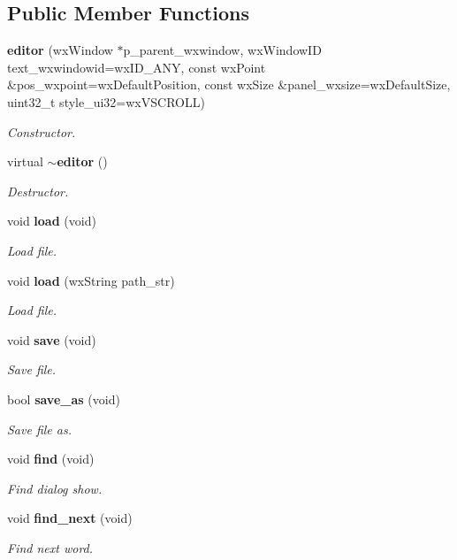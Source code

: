 \subsection*{Public Member Functions}
\begin{DoxyCompactItemize}
\item 
\textbf{ editor} (wx\+Window $\ast$p\+\_\+parent\+\_\+wxwindow, wx\+Window\+ID text\+\_\+wxwindowid=wx\+I\+D\+\_\+\+A\+NY, const wx\+Point \&pos\+\_\+wxpoint=wx\+Default\+Position, const wx\+Size \&panel\+\_\+wxsize=wx\+Default\+Size, uint32\+\_\+t style\+\_\+ui32=wx\+V\+S\+C\+R\+O\+LL)
\begin{DoxyCompactList}\small\item\em Constructor. \end{DoxyCompactList}\item 
virtual \textbf{ $\sim$editor} ()
\begin{DoxyCompactList}\small\item\em Destructor. \end{DoxyCompactList}\item 
void \textbf{ load} (void)
\begin{DoxyCompactList}\small\item\em Load file. \end{DoxyCompactList}\item 
void \textbf{ load} (wx\+String path\+\_\+str)
\begin{DoxyCompactList}\small\item\em Load file. \end{DoxyCompactList}\item 
void \textbf{ save} (void)
\begin{DoxyCompactList}\small\item\em Save file. \end{DoxyCompactList}\item 
bool \textbf{ save\+\_\+as} (void)
\begin{DoxyCompactList}\small\item\em Save file as. \end{DoxyCompactList}\item 
void \textbf{ find} (void)
\begin{DoxyCompactList}\small\item\em Find dialog show. \end{DoxyCompactList}\item 
void \textbf{ find\+\_\+next} (void)
\begin{DoxyCompactList}\small\item\em Find next word. \end{DoxyCompactList}\item 

\end{DoxyCompactItemize}
